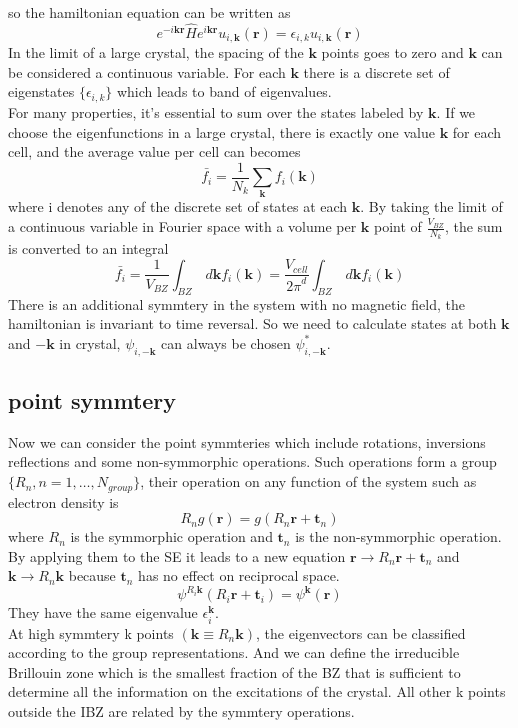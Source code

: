 \documentclass[11pt]{article}
\begin{document}
so the hamiltonian equation can be written as
\begin{equation}
    e^{-i\mathbf{kr}}\hat{H}e^{i\mathbf{kr}}u_{i,{\mathbf{k}}}(\mathbf{r})=\epsilon_{i,k}u_{i,{\mathbf{k}}}(\mathbf{r})
\end{equation}
In the limit of a large crystal, the spacing of the $\mathbf{k}$ points goes to zero and $\mathbf{k}$ can be considered a continuous variable. For 
each $\mathbf{k}$ there is a discrete set of eigenstates $\{\epsilon_{i,k}\}$ which leads to band of eigenvalues.\\
For many properties, it's essential to sum over the states labeled by $\mathbf{k}$. If we choose the eigenfunctions in a large crystal, there is exactly
one value $\mathbf{k}$ for each cell, and the average value per cell can becomes
\begin{equation}
    \bar{f_i}=\frac{1}{N_k}\sum_{\mathbf{k}}f_i(\mathbf{k})
\end{equation}
where i denotes any of the discrete set of states at each $\mathbf{k}$. By taking the limit of a continuous variable
in Fourier space with a volume per $\mathbf{k}$ point of $\frac{V_{BZ}}{N_k}$, the sum is converted to an integral
\begin{equation}
    \bar{f_i}=\frac{1}{V_{BZ}}\int_{BZ}\,d\mathbf{k}f_i(\mathbf{k})=\frac{V_{cell}}{{2\pi}^d}\int_{BZ}\,d\mathbf{k}f_i(\mathbf{k})
\end{equation}
There is an additional symmtery in the system with no magnetic field, the hamiltonian is invariant to time reversal.
So we need to calculate states at both $\mathbf{k}$ and $-\mathbf{k}$ in crystal, $\psi_{i,-\mathbf{k}}$ can always be
chosen  $\psi^*_{i,-\mathbf{k}}$.
\subsection{point symmtery}
Now we can consider the point symmteries which include rotations, inversions reflections and some non-symmorphic operations.
Such operations form a group$\{R_n,n=1,\ldots,N_{group}\}$, their operation on any function of the system such as electron density is
\begin{equation}
    R_n g(\mathbf{r})=g(R_n\mathbf{r}+\mathbf{t}_n)
\end{equation}
where $R_n$ is the symmorphic operation and $\mathbf{t}_n$ is the non-symmorphic operation. By applying them to the SE it leads to a
new equation $\mathbf{r}\rightarrow R_n\mathbf{r}+\mathbf{t}_n$ and $\mathbf{k}\rightarrow R_n\mathbf{k}$ because $\mathbf{t}_n$ has no
effect on reciprocal space.
\begin{equation}
    \psi^{R_i\mathbf{k}}(R_i\mathbf{r}+\mathbf{t}_i)=\psi^{\mathbf{k}}(\mathbf{r})
\end{equation}
They have the same eigenvalue $\epsilon_{i}^{\mathbf{k}}$.\\
At high symmtery k points $(\mathbf{k}\equiv R_n\mathbf{k})$, the eigenvectors can be classified according to the group representations. And
we can define the irreducible Brillouin zone which is the smallest fraction of the BZ that is sufficient to determine all the information on
the excitations of the crystal. All other k points outside the IBZ are related by the symmtery operations.
\end{document}
